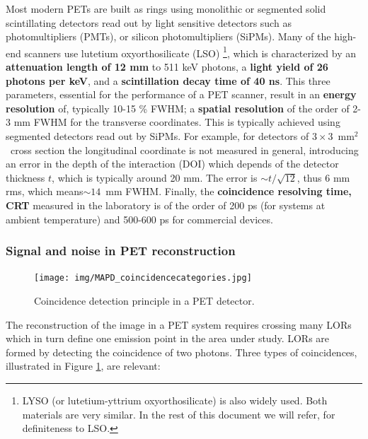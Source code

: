 Most modern PETs are built as rings using monolithic or segmented solid scintillating detectors read out by light sensitive detectors such as photomultipliers (PMTs), or silicon photomultipliers (SiPMs). Many of the high-end scanners use lutetium oxyorthosilicate (LSO) \footnote{LYSO (or lutetium-yttrium oxyorthosilicate) is also widely used. Both materials are very similar. In the rest of this document we will refer, for definiteness to LSO.}, which is characterized by an {\bf attenuation length of 12 mm} to 511 keV photons, a  {\bf light yield of 26 photons per keV}, and a {\bf scintillation decay time of 40 ns}. This three parameters, essential for the performance of a PET scanner, result in an {\bf energy resolution} of, typically 10-15 \% FWHM; a {\bf spatial resolution} of the order of 2-3 mm FWHM for the transverse coordinates. This is typically achieved using segmented detectors read out by SiPMs. For example, for detectors of $3 \times 3$~mm$^2$~cross section the longitudinal coordinate is not measured in general, introducing an error in the depth of the interaction (DOI) which depends of the detector thickness $t$, which is typically around 20 mm. The error is $\sim t/\sqrt{12}$, thus 6 mm rms, which means$\sim 14$~mm FWHM. Finally, the {\bf coincidence resolving time, CRT} measured in the laboratory is of the order of 200 ps (for systems at ambient temperature) and 500-600 ps for commercial devices.

\subsubsection*{Signal and noise in PET reconstruction}

\begin{figure}[!bthp]
	\centering
	\texttt{[image: img/MAPD\_coincidencecategories.jpg]}
	\caption{\label{fig.coi} Coincidence detection principle in a PET detector.}
\end{figure}

The reconstruction of the image in a PET system requires crossing many LORs which in turn define one emission point in the area under study. LORs are formed by detecting the coincidence of two photons. Three types of coincidences, illustrated in Figure \ref{fig.coi}, are relevant:


